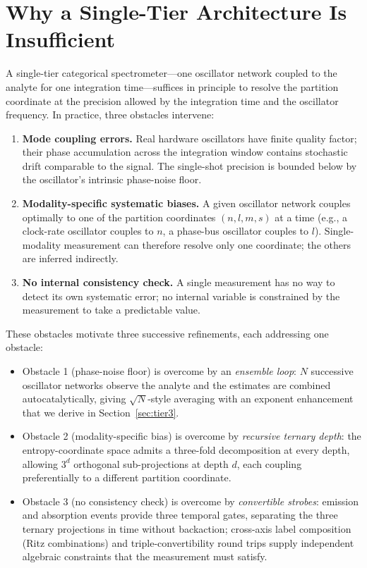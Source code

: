 \documentclass[twocolumn,11pt,a4paper]{article}
\theoremstyle{thmstyle}
\theoremstyle{axiomstyle}
\theoremstyle{definition}
\theoremstyle{remark}
\begin{document}
\section{Why a Single-Tier Architecture Is Insufficient}
\label{sec:whymultitier}

A single-tier categorical spectrometer---one oscillator network coupled to the analyte for one integration time---suffices in principle to resolve the partition coordinate at the precision allowed by the integration time and the oscillator frequency. In practice, three obstacles intervene:

\begin{enumerate}[nosep]
\item \textbf{Mode coupling errors.} Real hardware oscillators have finite quality factor; their phase accumulation across the integration window contains stochastic drift comparable to the signal. The single-shot precision is bounded below by the oscillator's intrinsic phase-noise floor.
\item \textbf{Modality-specific systematic biases.} A given oscillator network couples optimally to one of the partition coordinates $(n,l,m,s)$ at a time (e.g., a clock-rate oscillator couples to $n$, a phase-bus oscillator couples to $l$). Single-modality measurement can therefore resolve only one coordinate; the others are inferred indirectly.
\item \textbf{No internal consistency check.} A single measurement has no way to detect its own systematic error; no internal variable is constrained by the measurement to take a predictable value.
\end{enumerate}

These obstacles motivate three successive refinements, each addressing one obstacle:

\begin{itemize}[nosep]
\item Obstacle 1 (phase-noise floor) is overcome by an \emph{ensemble loop}: $N$ successive oscillator networks observe the analyte and the estimates are combined autocatalytically, giving $\sqrt{N}$-style averaging with an exponent enhancement that we derive in Section~\ref{sec:tier3}.
\item Obstacle 2 (modality-specific bias) is overcome by \emph{recursive ternary depth}: the entropy-coordinate space admits a three-fold decomposition at every depth, allowing $3^{d}$ orthogonal sub-projections at depth $d$, each coupling preferentially to a different partition coordinate.
\item Obstacle 3 (no consistency check) is overcome by \emph{convertible strobes}: emission and absorption events provide three temporal gates, separating the three ternary projections in time without backaction; cross-axis label composition (Ritz combinations) and triple-convertibility round trips supply independent algebraic constraints that the measurement must satisfy.
\end{itemize}
\end{document}
